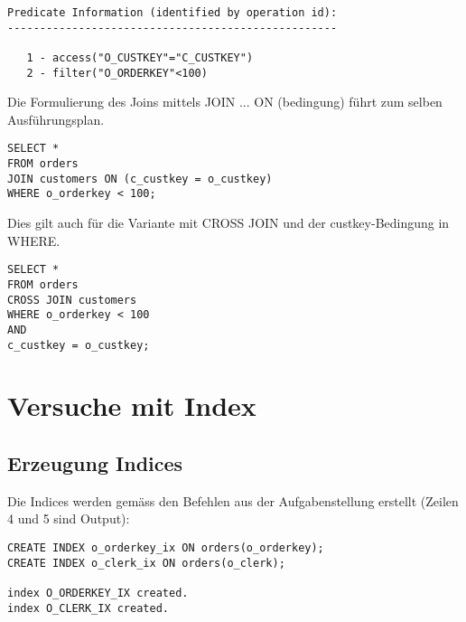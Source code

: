 \documentclass[11pt,a4paper,parskip=half]{scrartcl}
\begin{document}
\begin{lstlisting}
Predicate Information (identified by operation id):                                                                                                                                                                                                                                                          
---------------------------------------------------                                                                                                                                                                                                                                                          
                                                                                                                                                                                                                                                                                                             
   1 - access("O_CUSTKEY"="C_CUSTKEY")                                                                                                                                                                                                                                                                       
   2 - filter("O_ORDERKEY"<100)  
\end{lstlisting}

Die Formulierung des Joins mittels JOIN ... ON (bedingung) führt zum selben Ausführungsplan.
\begin{lstlisting}
SELECT *
FROM orders
JOIN customers ON (c_custkey = o_custkey)
WHERE o_orderkey < 100;
\end{lstlisting}

Dies gilt auch für die Variante mit CROSS JOIN und der custkey-Bedingung in WHERE.
\begin{lstlisting}
SELECT *
FROM orders
CROSS JOIN customers
WHERE o_orderkey < 100
AND
c_custkey = o_custkey;
\end{lstlisting}

\section{Versuche mit Index}
\subsection{Erzeugung Indices}
Die Indices werden gemäss den Befehlen aus der Aufgabenstellung erstellt (Zeilen 4 und 5 sind Output):
\begin{lstlisting}
CREATE INDEX o_orderkey_ix ON orders(o_orderkey);
CREATE INDEX o_clerk_ix ON orders(o_clerk);

index O_ORDERKEY_IX created.
index O_CLERK_IX created.
\end{lstlisting}
\end{document}
